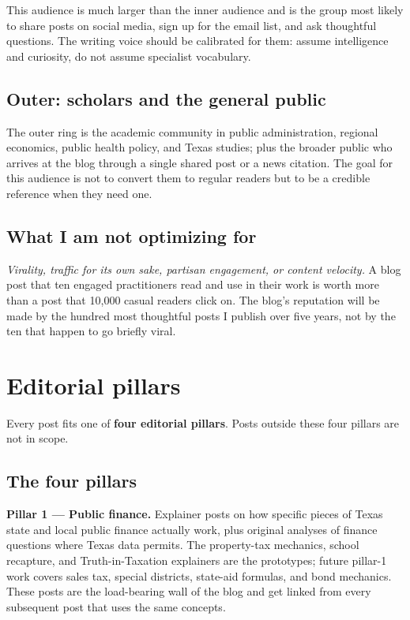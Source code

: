 \documentclass[11pt]{article}
\begin{document}
This audience is much larger than the inner audience and is the
group most likely to share posts on social media, sign up for the
email list, and ask thoughtful questions. The writing voice should
be calibrated for them: assume intelligence and curiosity, do not
assume specialist vocabulary.

\subsection{Outer: scholars and the general public}

The outer ring is the academic community in public administration,
regional economics, public health policy, and Texas studies; plus
the broader public who arrives at the blog through a single shared
post or a news citation. The goal for this audience is not to
convert them to regular readers but to be a credible reference
when they need one.

\subsection{What I am not optimizing for}

\textit{Virality, traffic for its own sake, partisan engagement,
or content velocity.} A blog post that ten engaged practitioners
read and use in their work is worth more than a post that 10{,}000
casual readers click on. The blog's reputation will be made by the
hundred most thoughtful posts I publish over five years, not by the
ten that happen to go briefly viral.

\section{Editorial pillars}

Every post fits one of \textbf{four editorial pillars}. Posts
outside these four pillars are not in scope.

\subsection{The four pillars}

\textbf{Pillar 1 --- Public finance.} Explainer posts on how
specific pieces of Texas state and local public finance actually
work, plus original analyses of finance questions where Texas
data permits. The property-tax mechanics, school recapture, and
Truth-in-Taxation explainers are the prototypes; future pillar-1
work covers sales tax, special districts, state-aid formulas, and
bond mechanics. These posts are the load-bearing wall of the
blog and get linked from every subsequent post that uses the
same concepts.
\end{document}
